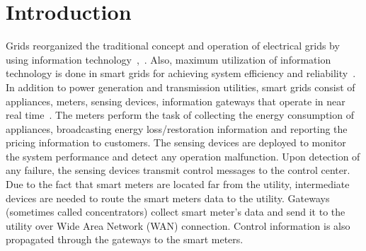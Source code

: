 \section{Introduction}

 Grids reorganized the traditional concept and operation of electrical grids by using information technology~\cite{Wu11},~\cite{Pindoriya2013}. Also, maximum utilization of information technology is done in smart grids for achieving system efficiency and reliability~\cite{Wang13}. In addition to power generation and transmission utilities, smart grids consist of appliances, meters, sensing devices, information gateways that operate in near real time~\cite{Khasawneh17}. The meters perform the task of collecting the energy consumption of appliances, broadcasting energy loss/restoration information and reporting the pricing information to customers. The sensing devices are deployed to monitor the system performance and detect any operation malfunction. Upon detection of any failure, the sensing devices transmit control messages to the control center. Due to the fact that smart meters are located far from the utility, intermediate devices are needed to route the smart meters data to the utility. Gateways (sometimes called concentrators) collect smart meter's data and send it to the utility over Wide Area Network (WAN) connection. Control information is also propagated through the gateways to the smart meters. 
